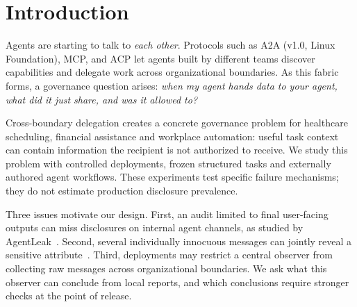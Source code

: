\documentclass[11pt]{article}
\begin{document}
\section{Introduction}
Agents are starting to talk to \emph{each other}. Protocols such as A2A (v1.0,
Linux Foundation), MCP, and ACP let agents built by different teams discover
capabilities and delegate work across organizational boundaries. As this fabric
forms, a governance question arises: \emph{when my agent hands
data to your agent, what did it just share, and was it allowed to?}

Cross-boundary delegation creates a concrete governance problem for healthcare
scheduling, financial assistance and workplace automation: useful task context
can contain information the recipient is not authorized to receive. We study this problem with controlled deployments, frozen structured tasks
and externally authored agent workflows. These experiments test specific failure
mechanisms; they do not estimate production disclosure prevalence.

Three issues motivate our design. First, an audit limited to final user-facing
outputs can miss disclosures on internal agent channels, as studied by
AgentLeak~\cite{agentleak}. Second, several individually innocuous messages can
jointly reveal a sensitive attribute~\cite{sumleaks}. Third, deployments may
restrict a central observer from collecting raw messages across organizational
boundaries. We ask what this observer can conclude from local reports, and
which conclusions require stronger checks at the point of release.
\end{document}
